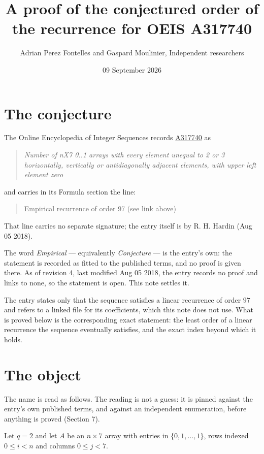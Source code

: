 \documentclass[11pt]{article}
\title{A proof of the conjectured order of the recurrence for OEIS A317740}
\author{Adrian Perez Fontelles and Gaspard Moulinier, Independent researchers}
\date{09 September 2026}
\theoremstyle{definition}
\begin{document}
\maketitle
\section{The conjecture}

The Online Encyclopedia of Integer Sequences records \href{https://oeis.org/A317740}{A317740} as

\begin{quote}\itshape Number of nX7 0..1 arrays with every element unequal to 2 or 3 horizontally, vertically or antidiagonally adjacent elements, with upper left element zero\end{quote}

and carries in its Formula section the line:

\begin{quote}\ttfamily Empirical recurrence of order 97 (see link above)\end{quote}

That line carries no separate signature; the entry itself is by R. H. Hardin (Aug 05 2018).

The word {\itshape Empirical} --- equivalently {\itshape Conjecture} --- is the entry's own: the statement is recorded as fitted to the published terms, and no proof is given there. As of revision 4, last modified Aug 05 2018, the entry records no proof and links to none, so the statement is open. This note settles it.

The entry states only that the sequence satisfies a linear recurrence of order $97$ and refers to a linked file for its coefficients, which this note does not use. What is proved below is the corresponding exact statement: the least order of a linear recurrence the sequence eventually satisfies, and the exact index beyond which it holds.

\section{The object}

The name is read as follows. The reading is not a guess: it is pinned against the entry's own published terms, and against an independent enumeration, before anything is proved (Section 7).

Let $q = 2$ and let $A$ be an $n \times 7$ array with entries in $\{0,1,\dots,1\}$, rows indexed $0 \le i < n$ and columns $0 \le j < 7$.
\end{document}
